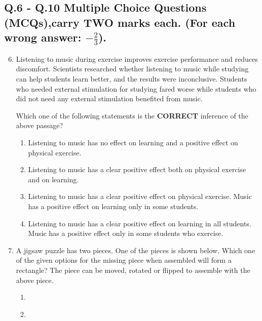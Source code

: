 \documentclass[journal,12pt,onecolumn]{IEEEtran}
\theoremstyle{remark}
\begin{document}
\subsection*{Q.6 - Q.10 Multiple Choice Questions (MCQs),carry \textbf{TWO} marks each. (For each wrong answer: $-\frac{2}{3}$).
}
\begin{enumerate}
    \setcounter{enumi}{5}
    \item Listening to music during exercise improves exercise performance and reduces discomfort. Scientists researched whether listening to music while studying can help students learn better, and the results were inconclusive. Students who needed external stimulation for studying fared worse while students who did not need any external stimulation benefited from music.
    
    Which one of the following statements is the \textbf{CORRECT} inference of the above passage?
    \begin{enumerate}
        \item Listening to music has no effect on learning and a positive effect on physical exercise.
        \item Listening to music has a clear positive effect both on physical exercise and on learning.
        \item Listening to music has a clear positive effect on physical exercise. Music has a positive effect on learning only in some students.
        \item Listening to music has a clear positive effect on learning in all students. Music has a positive effect only in some students who exercise.
    \end{enumerate}
    \item A jigsaw puzzle has two pieces. One of the pieces is shown below. Which one of the given options for the missing piece when assembled will form a rectangle? The piece can be moved, rotated or flipped to assemble with the above piece.
     \begin{figure}[H]
        \centering
         
    \end{figure}
    \begin{enumerate}
        \item  \begin{figure}[H]
        \centering
         
    \end{figure}
        \item  \begin{figure}[H]
        \centering
          

\end{figure}
\end{enumerate}
\end{enumerate}
\end{document}
